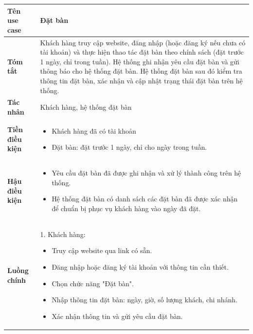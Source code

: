 \documentclass[a4paper]{article}
\begin{document}
\begin{itemize}
        \begin{table}[H]
            \centering
            \begin{tabular}{|p{3cm}|p{12cm}|}
                \hline
                \textbf{Tên use case} & Đặt bàn \\
                \hline
                \textbf{Tóm tắt} & Khách hàng truy cập website, đăng nhập (hoặc đăng ký nếu chưa có tài khoản) và thực hiện thao tác đặt bàn theo chính sách (đặt trước 1 ngày, chỉ trong tuần). Hệ thống ghi nhận yêu cầu đặt bàn và gửi thông báo cho hệ thống đặt bàn. Hệ thống đặt bàn sau đó kiểm tra thông tin đặt bàn, xác nhận và cập nhật trạng thái đặt bàn trên hệ thống. \\
                \hline
                \textbf{Tác nhân} & Khách hàng, hệ thống đặt bàn \\
                \hline
                \textbf{Tiền điều kiện} & 
                \begin{itemize}
                    \item Khách hàng đã có tài khoản
                    \item Đặt bàn: đặt trước 1 ngày, chỉ cho ngày trong tuần.
                \end{itemize} \\
                \hline
                \textbf{Hậu điều kiện} & 
                \begin{itemize}
                    \item Yêu cầu đặt bàn đã được ghi nhận và xử lý thành công trên hệ thống.
                    \item Hệ thống đặt bàn có danh sách các đặt bàn đã được xác nhận để chuẩn bị phục vụ khách hàng vào ngày đã đặt.
                \end{itemize} \\
                \hline
                \textbf{Luồng chính} & 
                1. Khách hàng:
                \begin{itemize}
                    \item Truy cập website qua link có sẵn.
                    \item Đăng nhập hoặc đăng ký tài khoản với thông tin cần thiết.
                    \item Chọn chức năng "Đặt bàn".
                    \item Nhập thông tin đặt bàn: ngày, giờ, số lượng khách, chi nhánh.
                    \item Xác nhận thông tin và gửi yêu cầu đặt bàn.
                \end{itemize}
                

\end{tabular}
\end{table}
\end{itemize}
\end{document}
